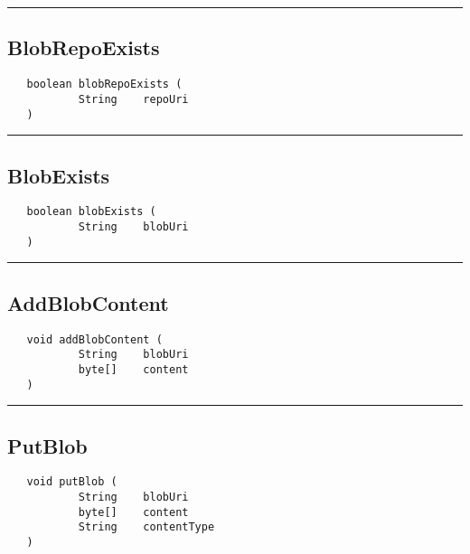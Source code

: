 \rule{15cm}{2pt}
\subsection{BlobRepoExists}
\label{Api:BlobRepoExists}
\begin{verbatim}
   boolean blobRepoExists (
           String    repoUri
   )
\end{verbatim}



\rule{15cm}{2pt}
\subsection{BlobExists}
\label{Api:BlobExists}
\begin{verbatim}
   boolean blobExists (
           String    blobUri
   )
\end{verbatim}



\rule{15cm}{2pt}
\subsection{AddBlobContent}
\label{Api:AddBlobContent}
\begin{verbatim}
   void addBlobContent (
           String    blobUri
           byte[]    content
   )
\end{verbatim}



\rule{15cm}{2pt}
\subsection{PutBlob}
\label{Api:PutBlob}
\begin{verbatim}
   void putBlob (
           String    blobUri
           byte[]    content
           String    contentType
   )
\end{verbatim}



